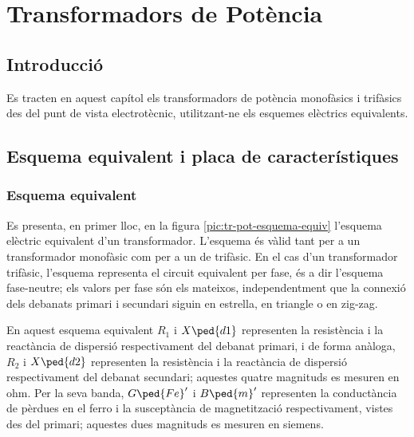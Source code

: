 
\chapter{Transformadors de Potència}\label{sec:ch-trafos-pot}

\section{Introducció}
Es tracten en aquest capítol els transformadors de potència
monofàsics i trifàsics des del punt de vista electrotècnic, utilitzant-ne els esquemes elèctrics equivalents.

\section{Esquema equivalent i placa de característiques}

\subsection{Esquema equivalent}

Es presenta, en primer lloc, en la figura \vref{pic:tr-pot-esquema-equiv} l'esquema elèctric equivalent d'un transformador.
L'esquema és vàlid tant per a un transformador monofàsic com per a un de trifàsic. En el cas d'un transformador trifàsic, l'esquema representa el circuit equivalent per fase, és a dir l'esquema fase-neutre; els valors per fase són els mateixos, independentment que la connexió dels debanats primari i secundari siguin en estrella, en triangle o en zig-zag.

\begin{center}
    
    \label{pic:tr-pot-esquema-equiv}
\end{center}

En aquest esquema equivalent $R_1$ i $X\ped{d1}$ representen la resistència i la reactància de dispersió respectivament del debanat primari, i de forma anàloga, $R_2$ i $X\ped{d2}$ representen la resistència i la reactància de dispersió respectivament del debanat secundari; aquestes quatre magnituds es mesuren en ohm. Per la seva banda, $G\ped{Fe}'$ i $B\ped{m}'$ representen la conductància de pèrdues en el ferro i la susceptància de magnetització respectivament, vistes des del primari; aquestes dues magnituds es mesuren en siemens.

